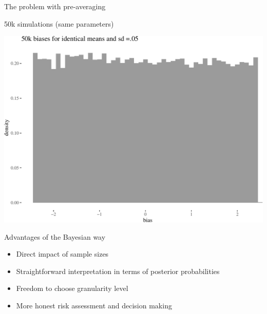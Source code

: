 \documentclass[10pt,ignorenonframetext,x11names, dvipsnames, bibspacing,natbib]{beamer}
\providecommand{\tightlist}{%
  \setlength{\itemsep}{0pt}\setlength{\parskip}{0pt}}
\begin{document}
\begin{frame}{The problem with pre-averaging}
\protect\hypertarget{the-problem-with-pre-averaging-2}{}

\begin{block}{50k simulations (same parameters)}

\vspace{1mm}
\footnotesize

\begin{center}\includegraphics[width=0.8\linewidth]{presentationESSLLI_files/figure-beamer/unnamed-chunk-8-1} \end{center}
\normalsize

\end{block}

\end{frame}

\begin{frame}{Advantages of the Bayesian way}
\protect\hypertarget{advantages-of-the-bayesian-way}{}

\begin{itemize}
\tightlist
\item
  Direct impact of sample sizes
\item
  Straightforward interpretation in terms of posterior probabilities
\item
  Freedom to choose granularity level
\item
  More honest risk assessment and decision making
\end{itemize}

\end{frame}
\end{document}
